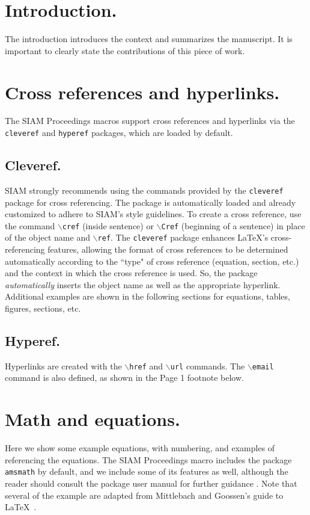 \documentclass[twoside,leqno]{article}
\begin{document}
\section{Introduction.}
The introduction introduces the context and summarizes the manuscript. It is important to clearly state the contributions of this piece of work.

\section{Cross references and hyperlinks.}
\label{sec:cr+hyp}

The SIAM Proceedings macros support cross references and hyperlinks via the
\texttt{cleveref} and \texttt{hyperef} packages, which are loaded by default.

\subsection{Cleveref.}
\label{sec:cleveref}

SIAM strongly recommends using the commands provided by 
the \texttt{cleveref} package for cross referencing.
The package is automatically loaded and already customized
to adhere to SIAM's style guidelines. 
To create a cross reference, use the command $\backslash$\texttt{cref} (inside
sentence) or $\backslash$\texttt{Cref} (beginning of a sentence) in place of the
object name and $\backslash$\texttt{ref}. 
The \texttt{cleveref} package enhances \LaTeX's cross-referencing features, 
allowing the format of cross references to be determined automatically
according to the ``type" of cross reference (equation, section, etc.)
and the context in which the cross reference is used.
So, the package \emph{automatically} inserts the object name as well as the
appropriate hyperlink.
Additional examples are shown in the following sections for equations, 
tables, figures, sections, etc.

\subsection{Hyperef.}
\label{sec:hyperef}

Hyperlinks are created with the $\backslash$\texttt{href} and $\backslash$\texttt{url} commands.
The $\backslash$\texttt{email} command is also defined, as shown in the
Page 1 footnote below.

\section{Math and equations.}
\label{sec:math}
Here we show some example equations, with numbering, and examples of
referencing the equations. The SIAM Proceedings macro includes the package 
\texttt{amsmath} by default, and we include some of its features as
well, although the reader should consult the package user manual for
further guidance \cite{amsmath,shortmath}.
Note that several of the example are adapted from Mittlebach and Goossen's 
guide to \LaTeX~\cite{MiGo04}.
\end{document}
